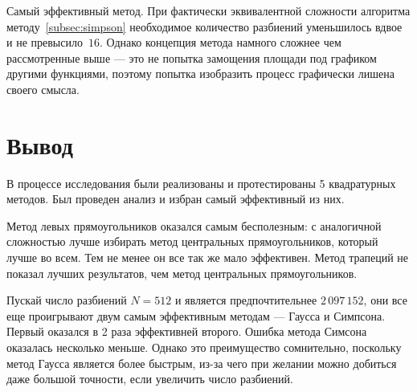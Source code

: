 \documentclass[a4paper, 14pt]{extarticle}
\begin{document}
    Самый эффективный метод.
    При фактически эквивалентной сложности алгоритма методу~\ref{subsec:simpson} необходимое количество разбиений
    уменьшилось вдвое и не превысило~$16$.
    Однако концепция метода намного сложнее чем рассмотренные выше --- это не попытка замощения площади под графиком
    другими функциями, поэтому попытка изобразить процесс графически лишена своего смысла.
    \newpage


    \section{Вывод}\label{sec:}
    В процессе исследования были реализованы и протестированы 5 квадратурных методов.
    Был проведен анализ и избран самый эффективный из них.

    Метод левых прямоугольников оказался самым бесполезным: с аналогичной сложностью лучше избирать метод центральных
    прямоугольников, который лучше во всем.
    Тем не менее он все так же мало эффективен.
    Метод трапеций не показал лучших результатов, чем метод центральных прямоугольников.

    Пускай число разбиений $N=512$ и является предпочтительнее $2\,097\,152$, они все еще проигрывают двум самым
    эффективным методам --- Гаусса и Симпсона.
    Первый оказался в 2 раза эффективней второго.
    Ошибка метода Симсона оказалась несколько меньше.
    Однако это преимущество сомнительно, поскольку метод Гаусса является более быстрым, из-за чего при желании
    можно добиться даже большой точности, если увеличить число разбиений.
    \newpage
\end{document}
